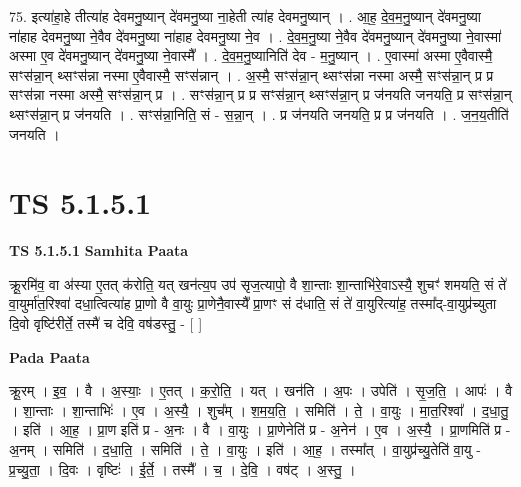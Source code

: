 \documentclass[17pt]{extarticle}
\begin{document}
75. इत्या॑हा॒हे तीत्या॑ह देवमनु॒ष्यान् दे॑वमनु॒ष्या ना॒हेती त्या॑ह देवमनु॒ष्यान् । . आ॒ह॒ दे॒व॒म॒नु॒ष्यान् दे॑वमनु॒ष्या ना॑हाह देवमनु॒ष्या ने॒वैव दे॑वमनु॒ष्या ना॑हाह देवमनु॒ष्या ने॒व । . दे॒व॒म॒नु॒ष्या ने॒वैव दे॑वमनु॒ष्यान् दे॑वमनु॒ष्या ने॒वास्मा॑ अस्मा ए॒व दे॑वमनु॒ष्यान् दे॑वमनु॒ष्या ने॒वास्मै᳚ । . दे॒व॒म॒नु॒ष्यानिति॑ देव - म॒नु॒ष्यान् । . ए॒वास्मा॑ अस्मा ए॒वैवास्मै॒ सꣳस॑न्ना॒न् थ्सꣳस॑न्ना नस्मा ए॒वैवास्मै॒ सꣳस॑न्नान् । . अ॒स्मै॒ सꣳस॑न्ना॒न् थ्सꣳस॑न्ना नस्मा अस्मै॒ सꣳस॑न्ना॒न् प्र प्र सꣳस॑न्ना नस्मा अस्मै॒ सꣳस॑न्ना॒न् प्र । . सꣳस॑न्ना॒न् प्र प्र सꣳस॑न्ना॒न् थ्सꣳस॑न्ना॒न् प्र ज॑नयति जनयति॒ प्र सꣳस॑न्ना॒न् थ्सꣳस॑न्ना॒न् प्र ज॑नयति । . सꣳस॑न्ना॒निति॒ सं - स॒न्ना॒न् । . प्र ज॑नयति जनयति॒ प्र प्र ज॑नयति । . ज॒न॒य॒तीति॑ जनयति । \newline
\pagebreak
{}

\section{ TS 5.1.5.1 }

\textbf{TS 5.1.5.1 } \newline
\textbf{Samhita Paata} \newline

क्रू॒रमि॑व॒ वा अ॑स्या ए॒तत् क॑रोति॒ यत् खन॑त्य॒प उप॑ सृज॒त्यापो॒ वै शा॒न्ताः शा॒न्ताभि॑रे॒वाऽस्यै॒ शुचꣳ॑ शमयति॒ सं ते॑ वा॒युर्मा॑त॒रिश्वा॑ दधा॒त्वित्या॑ह प्रा॒णो वै वा॒युः प्रा॒णेनै॒वास्यै᳚ प्रा॒णꣳ सं द॑धाति॒ सं ते॑ वा॒युरित्या॑ह॒ तस्मा᳚द्-वा॒युप्र॑च्युता दि॒वो वृष्टि॑रीर्ते॒ तस्मै॑ च देवि॒ वष॑डस्तु॒ - [  ] \newline

\textbf{Pada Paata} \newline

क्रू॒रम् । इ॒व॒ । वै । अ॒स्याः॒ । ए॒तत् । क॒रो॒ति॒ । यत् । खन॑ति । अ॒पः । उपेति॑ । सृ॒ज॒ति॒ । आपः॑ । वै । शा॒न्ताः । शा॒न्ताभिः॑ । ए॒व । अ॒स्यै॒ । शुच᳚म् । श॒म॒य॒ति॒ । समिति॑ । ते॒ । वा॒युः । मा॒त॒रिश्वा᳚ । द॒धा॒तु॒ । इति॑ । आ॒ह॒ । प्रा॒ण इति॑ प्र - अ॒नः । वै । वा॒युः । प्रा॒णेनेति॑ प्र - अ॒नेन॑ । ए॒व । अ॒स्यै॒ । प्रा॒णमिति॑ प्र - अ॒नम् । समिति॑ । द॒धा॒ति॒ । समिति॑ । ते॒ । वा॒युः । इति॑ । आ॒ह॒ । तस्मा᳚त् । वा॒युप्र॑च्यु॒तेति॑ वा॒यु - प्र॒च्यु॒ता॒ । दि॒वः । वृष्टिः॑ । ई॒र्ते॒ । तस्मै᳚ । च॒ । दे॒वि॒ । वष॑ट् । अ॒स्तु॒ ।  \newline
\end{document}
